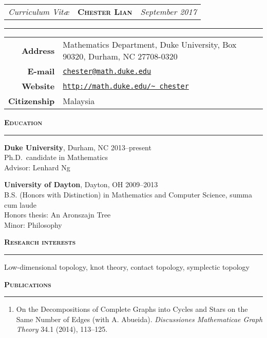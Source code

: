 \documentclass[10pt]{article}
\newcommand{\sect}[1]{
  \vspace{.75em}
  \textbf{\textsc{\Large #1}}

  \vspace{-1.5em}
  \noindent\rule{\textwidth}{.5pt}
  \vspace{-1.5em}
}
\begin{document}
\thispagestyle{empty} %

\begin{tabularx}{\textwidth}{@{}X >{\centering}X X@{}}
  \emph{\large Curriculum Vit\ae} &
  \textbf{\textsc{\huge Chester Lian}} &
  \hfill\emph{\large September 2017}
\end{tabularx}

\vspace{-1em}
\rule{\textwidth}{1pt}

\begin{center}
\begin{tabular}{rl}
\textbf{Address} &
Mathematics Department, Duke University, Box 90320, Durham, NC 27708-0320 \\
\textbf{E-mail} & \href{mailto:chester@math.duke.edu}{\texttt{chester@math.duke.edu}} \\
\textbf{Website} &
\href{http://math.duke.edu/\~chester}{\texttt{http://math.duke.edu/\textasciitilde
chester}} \\
\textbf{Citizenship} & Malaysia
\end{tabular}
\end{center}
\vspace{-1em}

\sect{Education}

\textbf{Duke University}, Durham, NC \hfill 2013--present \\
Ph.D.\ candidate in Mathematics \\
Advisor: Lenhard Ng

\textbf{University of Dayton}, Dayton, OH \hfill 2009--2013 \\
B.S. (Honors with Distinction) in Mathematics and Computer Science, summa cum
laude \\
Honors thesis: An Aronszajn Tree \\
Minor: Philosophy

\sect{Research interests}

Low-dimensional topology, knot theory, contact topology, symplectic topology

\sect{Publications}

\vspace{-1em}
\begin{enumerate}

  \item On the Decompositions of Complete Graphs into Cycles and Stars on the
  Same Number of Edges (with A. Abueida). \emph{Discussiones
  Mathematicae Graph Theory} 34.1 (2014), 113--125.

\end{enumerate}
\vspace{-1em}
\end{document}
